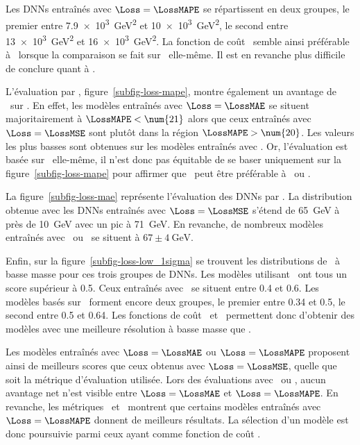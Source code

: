 Les DNNs entraînés avec $\Loss=\LossMAPE$
se répartissent en deux groupes,
le premier
entre \SI{7.9e3}{\GeV^2} et \SI{10e3}{\GeV^2},
le second
entre \SI{13e3}{\GeV^2} et \SI{16e3}{\GeV^2}.
La fonction de coût \LossMAE\ semble ainsi préférable à \LossMSE\ lorsque la comparaison se fait sur \LossMSE\ elle-même.
Il est en revanche plus difficile de conclure quant à \LossMAPE.
\par
L'évaluation par \LossMAPE, figure~\ref{subfig-loss-mape},
montre également un avantage de \LossMAE\ sur \LossMSE.
En effet, les modèles
entraînés avec $\Loss=\LossMAE$
se situent majoritairement à $\LossMAPE<\num{21}$
alors que ceux
entraînés avec $\Loss=\LossMSE$
sont plutôt dans la région $\LossMAPE>\num{20}$.
Les valeurs les plus basses sont obtenues sur les modèles entraînés avec \LossMAPE.
Or, l'évaluation est basée sur \LossMAPE\ elle-même,
il n'est donc pas équitable de se baser uniquement sur la figure~\ref{subfig-loss-mape}
pour affirmer que \LossMAPE\ peut être préférable à \LossMAE\ ou \LossMSE.
\par
La figure~\ref{subfig-loss-mae} représente l'évaluation des DNNs par \LossMAE.
La distribution obtenue avec les DNNs entraînés avec $\Loss=\LossMSE$
s'étend de \SI{65}{\GeV} à près de \SI{10}{\GeV} avec un pic à \SI{71}{\GeV}.
En revanche, de nombreux modèles entraînés avec \LossMAE\ ou \LossMAPE\
se situent à $\num{67}\pm\SI{4}{\GeV}$.
\par
Enfin,
sur la figure~\ref{subfig-loss-low_1sigma} se trouvent les distributions
de \OneSigmaWidth\ à basse masse pour ces trois groupes de DNNs.
Les modèles utilisant \LossMSE\ ont tous un score supérieur à \num{0.5}.
Ceux entraînés avec \LossMAE\ se situent entre \num{0.4} et \num{0.6}.
Les modèles basés sur \LossMAPE\ forment encore deux groupes,
le premier entre \num{0.34} et \num{0.5},
le second entre \num{0.5} et \num{0.64}.
Les fonctions de coût \LossMAPE\ et \LossMAE\ permettent donc d'obtenir des modèles avec une meilleure résolution à basse masse que \LossMSE.
\par
Les modèles entraînés avec $\Loss=\LossMAE$ ou $\Loss=\LossMAPE$
proposent ainsi de meilleurs scores que ceux obtenus avec $\Loss=\LossMSE$,
quelle que soit la métrique d'évaluation utilisée.
Lors des évaluations avec \LossMSE\ ou \LossMAE,
aucun avantage net n'est visible entre $\Loss=\LossMAE$ et $\Loss=\LossMAPE$.
En revanche, les métriques \LossMAPE\ et \OneSigmaWidth\ montrent que certains modèles
entraînés avec $\Loss=\LossMAPE$
donnent de meilleurs résultats.
La sélection d'un modèle est donc poursuivie parmi ceux ayant comme fonction de coût \LossMAPE.
